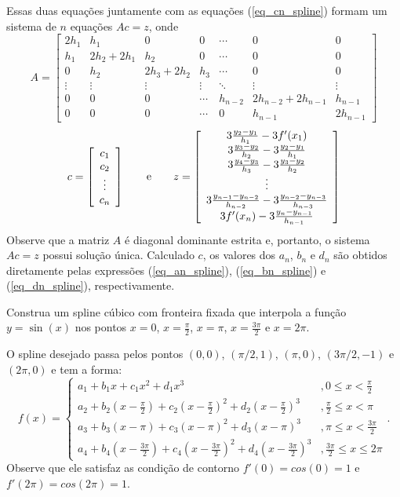 \documentclass[main.tex]{subfiles}
\begin{document}
Essas duas equações juntamente com as equações (\ref{eq_cn_spline}) formam um sistema de $n$ equações $Ac = z$, onde
\begin{equation*}
A=\left[\begin{array}{ccccccc}
2h_1 &h_1&0&0 &\cdots&0&0\\
h_1&2h_2+2h_{1}&h_2&0&\cdots&0&0\\
0&h_2&2h_3+2h_{2}&h_3&\cdots&0&0\\
\vdots&\vdots&\vdots&\vdots&\ddots&\vdots&\vdots\\
0&0&0&\cdots&h_{n-2} & 2h_{n-2}+2h_{n-1}&h_{n-1}\\
0&0&0&\cdots &0&h_{n-1}&2h_{n-1}
\end{array}\right]  
\end{equation*}  
\begin{equation*}
c = \left[\begin{array}{c}
c_1\\
c_2\\
\vdots\\
c_n
\end{array}\right]\qquad \hbox{e}\qquad
z = \left[\begin{array}{c}
3\frac{y_{2}-y_1}{h_1}-3f'(x_1)\\
3\frac{y_{3}-y_2}{h_2}-3\frac{y_{2}-y_{1}}{h_{1}}\\
3\frac{y_{4}-y_3}{h_3}-3\frac{y_{3}-y_{2}}{h_{2}}\\
\vdots\\
3\frac{y_{n-1}-y_{n-2}}{h_{n-2}}-3\frac{y_{n-2}-y_{n-3}}{h_{n-3}}\\
3f'(x_n)-3\frac{y_{n}-y_{n-1}}{h_{n-1}}
\end{array}\right]  
\end{equation*}
Observe que a matriz $A$ é diagonal dominante estrita e, portanto, o sistema $Ac = z$ possui solução única. Calculado $c$, os valores dos $a_n$, $b_n$ e $d_n$ são obtidos diretamente pelas expressões (\ref{eq_an_spline}), (\ref{eq_bn_spline}) e (\ref{eq_dn_spline}), respectivamente.


\begin{ex}Construa um spline cúbico com fronteira fixada que interpola a função $y=\sin (x)$ nos pontos $x=0$, $x=\frac{\pi}{2}$, $x=\pi$, $x=\frac{3\pi}{2}$ e $x=2\pi$.
\end{ex}
O spline desejado passa pelos pontos $(0,0)$, $(\pi/2,1)$, $(\pi,0)$, $(3\pi/2,-1)$ e $(2\pi,0)$ e tem a forma:
\begin{equation*}
f(x)=\left\{\begin{array}{ll}
a_1+b_1x+c_1x^2+d_1x^3&, 0\leq x<\frac{\pi}{2}\\
a_2+b_2(x-\frac{\pi}{2})+c_2(x-\frac{\pi}{2})^2+d_2(x-\frac{\pi}{2})^3&, \frac{\pi}{2}\leq x<\pi\\
a_3+b_3(x-\pi)+c_3(x-\pi)^2+d_3(x-\pi)^3&, \pi\leq x<\frac{3\pi}{2}\\
a_4+b_4(x-\frac{3\pi}{2})+c_4(x-\frac{3\pi}{2})^2+d_4(x-\frac{3\pi}{2})^3&, \frac{3\pi}{2}\leq x\leq 2\pi
\end{array}\right..  
\end{equation*}
Observe que ele satisfaz as condição de contorno $f'(0)=cos(0)=1$ e $f'(2\pi)=cos(2\pi)=1$.
\end{document}
